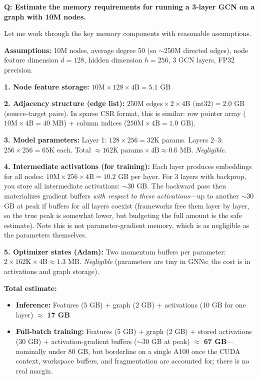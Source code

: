 \begin{interviewq}
\textbf{Q: Estimate the memory requirements for running a 3-layer GCN on a graph with 10M nodes.}

 \quad {} \quad \badgefreq{\freqlow}

\stronganswer

Let me work through the key memory components with reasonable assumptions.

\textbf{Assumptions:} 10M nodes, average degree 50 (so $\sim$250M directed edges), node feature dimension $d = 128$, hidden dimension $h = 256$, 3 GCN layers, FP32 precision.

\textbf{1. Node feature storage:}
$10\text{M} \times 128 \times 4\text{B} = 5.1\text{ GB}$

\textbf{2. Adjacency structure (edge list):}
$250\text{M edges} \times 2 \times 4\text{B (int32)} = 2.0\text{ GB}$ (source-target pairs).
In sparse CSR format, this is similar: row pointer array ($10\text{M} \times 4\text{B} = 40\text{ MB}$) + column indices ($250\text{M} \times 4\text{B} = 1.0\text{ GB}$).

\textbf{3. Model parameters:}
Layer 1: $128 \times 256 = 32\text{K params}$. Layers 2--3: $256 \times 256 = 65\text{K each}$. Total $\approx 162\text{K params} \times 4\text{B} \approx 0.6\text{ MB}$. \textit{Negligible.}

\textbf{4. Intermediate activations (for training):}
Each layer produces embeddings for all nodes: $10\text{M} \times 256 \times 4\text{B} = 10.2\text{ GB per layer}$. For 3 layers with backprop, you store all intermediate activations: $\sim$30 GB. The backward pass then materializes gradient buffers \textit{with respect to these activations}---up to another $\sim$30 GB at peak if buffers for all layers coexist (frameworks free them layer by layer, so the true peak is somewhat lower, but budgeting the full amount is the safe estimate). Note this is not parameter-gradient memory, which is as negligible as the parameters themselves.

\textbf{5. Optimizer states (Adam):}
Two momentum buffers per parameter: $2 \times 162\text{K} \times 4\text{B} \approx 1.3\text{ MB}$. \textit{Negligible} (parameters are tiny in GNNs; the cost is in activations and graph storage).

\textbf{Total estimate:}
\begin{itemize}
    \item \textbf{Inference:} Features (5 GB) + graph (2 GB) + activations (10 GB for one layer) $\approx$ \textbf{17 GB}
    \item \textbf{Full-batch training:} Features (5 GB) + graph (2 GB) + stored activations (30 GB) + activation-gradient buffers ($\sim$30 GB at peak) $\approx$ \textbf{67 GB}---nominally under 80 GB, but borderline on a single A100 once the CUDA context, workspace buffers, and fragmentation are accounted for; there is no real margin.
\end{itemize}


\end{interviewq}
